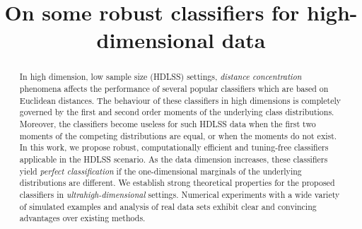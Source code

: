 \documentclass[twoside]{article}
\title{On some robust classifiers for high-dimensional data}%
\newcommand{\0}{\mathbf{0}}
\newcommand{\1}{\mathbf{1}}
\numberwithin{equation}{section}
\begin{document}
%

%


\begin{abstract}
In high dimension, low sample size (HDLSS) settings, \emph{distance concentration} phenomena affects the performance of several popular classifiers which are based on Euclidean distances. The behaviour of these classifiers in high dimensions is completely governed by the first and second order moments of the underlying class distributions. Moreover, the classifiers become useless for such HDLSS data when the first two moments of the competing distributions are equal, or when the moments do not exist. In this work, we propose robust, computationally efficient and tuning-free classifiers applicable in the HDLSS scenario. As the data dimension increases, these classifiers yield \emph{perfect classification} if the one-dimensional marginals of the underlying distributions are different. We establish strong theoretical properties for the proposed classifiers in \emph{ultrahigh-dimensional} settings. Numerical experiments with a wide variety of simulated examples and analysis of real data sets exhibit clear and convincing advantages over existing methods.
\end{abstract}
\end{document}
